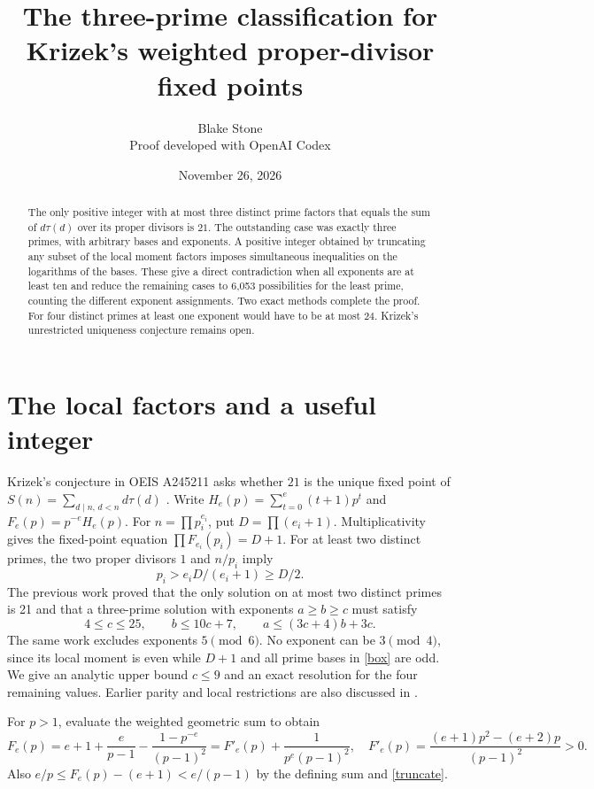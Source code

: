\documentclass[11pt]{article}
\title{The three-prime classification for Krizek's weighted proper-divisor fixed points}
\author{Blake Stone\\\small Proof developed with OpenAI Codex}
\date{November 26, 2026}
\begin{document}
\maketitle
\begin{abstract}
The only positive integer with at most three distinct prime factors that equals the sum of $d\tau(d)$ over its proper divisors is $21$. The outstanding case was exactly three primes, with arbitrary bases and exponents. A positive integer obtained by truncating any subset of the local moment factors imposes simultaneous inequalities on the logarithms of the bases. These give a direct contradiction when all exponents are at least ten and reduce the remaining cases to 6,053 possibilities for the least prime, counting the different exponent assignments. Two exact methods complete the proof. For four distinct primes at least one exponent would have to be at most 24. Krizek's unrestricted uniqueness conjecture remains open.
\end{abstract}

\section{The local factors and a useful integer}
Krizek's conjecture in OEIS A245211 asks whether $21$ is the unique fixed point of $S(n)=\sum_{d\mid n,\,d<n}d\tau(d)$ \cite{oeis}. Write $H_e(p)=\sum_{t=0}^e(t+1)p^t$ and $F_e(p)=p^{-e}H_e(p)$. For $n=\prod p_i^{e_i}$, put $D=\prod(e_i+1)$. Multiplicativity gives the fixed-point equation $\prod F_{e_i}(p_i)=D+1$. For at least two distinct primes, the two proper divisors $1$ and $n/p_i$ imply
\begin{equation}
 p_i>e_iD/(e_i+1)\ge D/2. \label{prime-bound}
\end{equation}
The previous work \cite{first,second} proved that the only solution on at most two distinct primes is 21 and that a three-prime solution with exponents $a\ge b\ge c$ must satisfy
\begin{equation}
 4\le c\le25,\qquad b\le10c+7,\qquad a\le(3c+4)b+3c.\label{box}
\end{equation}
The same work excludes exponents $5\pmod6$. No exponent can be $3\pmod4$, since its local moment is even while $D+1$ and all prime bases in \eqref{box} are odd. We give an analytic upper bound $c\le9$ and an exact resolution for the four remaining values. Earlier parity and local restrictions are also discussed in \cite{sugui,community}.

For $p>1$, evaluate the weighted geometric sum to obtain
\begin{equation}
 F_e(p)= e+1+\frac e{p-1}-\frac{1-p^{-e}}{(p-1)^2}
       =F'_e(p)+\frac{1}{p^e(p-1)^2},\quad
 F'_e(p)=\frac{(e+1)p^2-(e+2)p}{(p-1)^2}>0. \label{truncate}
\end{equation}
Also $e/p\le F_e(p)-(e+1)<e/(p-1)$ by the defining sum and \eqref{truncate}.
\end{document}
